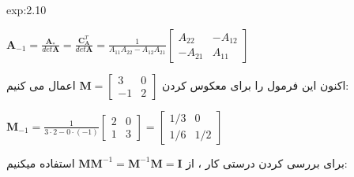 {\begin{spacing}{1.5}
\begin{example}{exp:2.10}
            \begin{center}
                $\textbf{A}_{-1}=\frac{\displaystyle \textbf{A}_{*}}{\displaystyle det\textbf{A}}=\frac{\displaystyle \textbf{C}^{T}_{\textbf{A}}}{\displaystyle det\textbf{A}}=\frac{\displaystyle 1}{\displaystyle A_{11}A_{22}-A_{12}A_{21}}\begin{bmatrix}
                                                                                                                                                                                                                                                   A_{22}  & -A_{12} \\
                                                                                                                                                                                                                                                   -A_{21} & A_{11}
                \end{bmatrix}$
            \end{center}

            اکنون این فرمول را برای معکوس کردن $\textbf{M}=\begin{bmatrix}
                                                               3  & 0 \\
                                                               -1 & 2
            \end{bmatrix}$ اعمال می کنیم:

            \begin{center}
                $\textbf{M}_{-1}=\frac{\displaystyle 1}{\displaystyle 3\cdot 2-0\cdot(-1)}\begin{bmatrix}
                                                                                              2 & 0 \\
                                                                                              1 & 3
                \end{bmatrix}=\begin{bmatrix}
                                  1/3 & 0   \\
                                  1/6 & 1/2
                \end{bmatrix}$
            \end{center}

            برای بررسی کردن درستی کار ، از $\textbf{M}\textbf{M}^{-1}=\textbf{M}^{-1}\textbf{M}=\textbf{I}$ استفاده میکنیم:


\end{example}
\end{spacing}}
